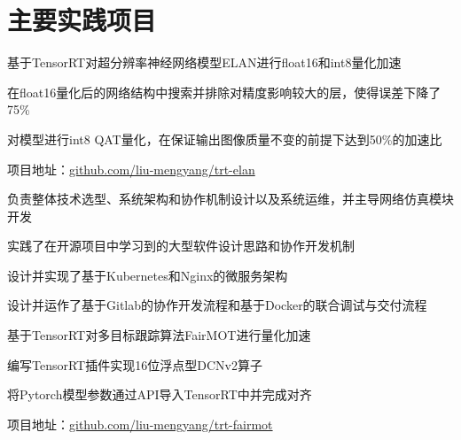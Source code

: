 \documentclass[]{deedy-resume-openfont}
\begin{document}
\begin{minipage}[t]{0.77\textwidth}
    \section{主要实践项目}
	\begin{tightemize}
		\item 基于TensorRT对超分辨率神经网络模型ELAN进行float16和int8量化加速
		\item 在float16量化后的网络结构中搜索并排除对精度影响较大的层，使得误差下降了75\%
		\item 对模型进行int8 QAT量化，在保证输出图像质量不变的前提下达到50\%的加速比
		\item 项目地址：\href{https://github.com/liu-mengyang/trt-elan}{github.com/liu-mengyang/trt-elan}
	\end{tightemize}
	\sectionsep

	\begin{tightemize}
		\item 负责整体技术选型、系统架构和协作机制设计以及系统运维，并主导网络仿真模块开发
		\item 实践了在开源项目中学习到的大型软件设计思路和协作开发机制
		\item 设计并实现了基于Kubernetes和Nginx的微服务架构
		\item 设计并运作了基于Gitlab的协作开发流程和基于Docker的联合调试与交付流程
	\end{tightemize}
	\sectionsep

	\begin{tightemize}
		\item 基于TensorRT对多目标跟踪算法FairMOT进行量化加速
		\item 编写TensorRT插件实现16位浮点型DCNv2算子
		\item 将Pytorch模型参数通过API导入TensorRT中并完成对齐
		\item 项目地址：\href{https://github.com/liu-mengyang/trt-fairmot}{github.com/liu-mengyang/trt-fairmot}
	\end{tightemize}
	\sectionsep



\end{minipage}
\end{document}
